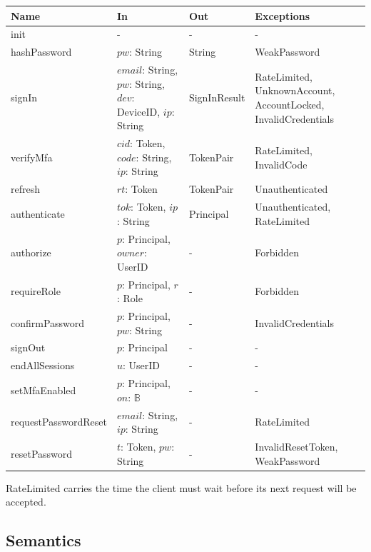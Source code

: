 \documentclass[12pt, titlepage]{article}
\begin{document}
\begin{center}
\renewcommand{\arraystretch}{1.2}
\begin{tabular}{>{\raggedright\arraybackslash}p{3.3cm}
  >{\raggedright\arraybackslash}p{4.6cm}
  >{\raggedright\arraybackslash}p{2.4cm}
  >{\raggedright\arraybackslash}p{4cm}}
\toprule
\textbf{Name} & \textbf{In} & \textbf{Out} & \textbf{Exceptions} \\
\midrule
init & - & - & - \\
hashPassword & $\mathit{pw}$: String & String & WeakPassword \\
signIn & $\mathit{email}$: String, $\mathit{pw}$: String, $\mathit{dev}$:
  DeviceID, $\mathit{ip}$: String & SignInResult & RateLimited,
  UnknownAccount, AccountLocked, InvalidCredentials \\
verifyMfa & $\mathit{cid}$: Token, $\mathit{code}$: String, $\mathit{ip}$:
  String & TokenPair & RateLimited, InvalidCode \\
refresh & $\mathit{rt}$: Token & TokenPair & Unauthenticated \\
authenticate & $\mathit{tok}$: Token, $\mathit{ip}$: String & Principal &
  Unauthenticated, RateLimited \\
authorize & $p$: Principal, $\mathit{owner}$: UserID & - & Forbidden \\
requireRole & $p$: Principal, $r$: Role & - & Forbidden \\
confirmPassword & $p$: Principal, $\mathit{pw}$: String & - &
  InvalidCredentials \\
signOut & $p$: Principal & - & - \\
endAllSessions & $u$: UserID & - & - \\
setMfaEnabled & $p$: Principal, $\mathit{on}$: $\mathbb{B}$ & - & - \\
requestPassword\-Reset & $\mathit{email}$: String, $\mathit{ip}$: String & - &
  RateLimited \\
resetPassword & $t$: Token, $\mathit{pw}$: String & - & InvalidResetToken,
  WeakPassword \\
\bottomrule
\end{tabular}
\end{center}

\noindent RateLimited carries the time the client must wait before its next
request will be accepted.

\subsection{Semantics}
\end{document}

